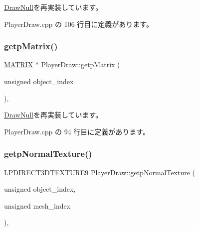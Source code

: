 \mbox{\hyperlink{class_draw_null_aa07d7e89e723b68ec257da0f63d43f70}{Draw\+Null}}を再実装しています。



 Player\+Draw.\+cpp の 106 行目に定義があります。

\mbox{\label{class_player_draw_a334e94f368f6bd571da866d69333f313}} 
\subsubsection{\texorpdfstring{getp\+Matrix()}{getpMatrix()}}
{\footnotesize\ttfamily \mbox{\hyperlink{_vector3_d_8h_a032295cd9fb1b711757c90667278e744}{M\+A\+T\+R\+IX}} $\ast$ Player\+Draw\+::getp\+Matrix (\begin{DoxyParamCaption}\item[{unsigned}]{object\+\_\+index }\end{DoxyParamCaption})\hspace{0.3cm}{\ttfamily [override]}, {\ttfamily [virtual]}}



\mbox{\hyperlink{class_draw_null_a001901c340671106a33d44b9d4aef4c4}{Draw\+Null}}を再実装しています。



 Player\+Draw.\+cpp の 94 行目に定義があります。

\mbox{\label{class_player_draw_a231aa618a0bf71311b61897ccf7191b8}} 
\subsubsection{\texorpdfstring{getp\+Normal\+Texture()}{getpNormalTexture()}}
{\footnotesize\ttfamily L\+P\+D\+I\+R\+E\+C\+T3\+D\+T\+E\+X\+T\+U\+R\+E9 Player\+Draw\+::getp\+Normal\+Texture (\begin{DoxyParamCaption}\item[{unsigned}]{object\+\_\+index,  }\item[{unsigned}]{mesh\+\_\+index }\end{DoxyParamCaption})\hspace{0.3cm}{\ttfamily [override]}, {\ttfamily [virtual]}}



